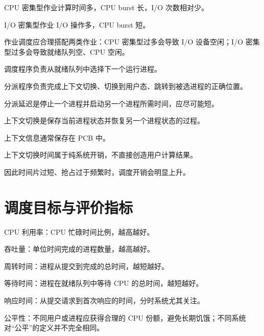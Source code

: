 \begin{points}
  \item CPU 密集型作业计算时间多，CPU burst 长，I/O 次数相对少。
  \item I/O 密集型作业 I/O 操作多，CPU burst 短。
  \item 作业调度应合理搭配两类作业：CPU 密集型过多会导致 I/O 设备空闲；I/O 密集型过多会导致就绪队列空、CPU 空闲。
\end{points}


\begin{points}
  \item 调度程序负责从就绪队列中选择下一个运行进程。
  \item 分派程序负责完成上下文切换、切换到用户态、跳转到被选进程的正确位置。
  \item 分派延迟是停止一个进程并启动另一个进程所需时间，应尽可能短。
\end{points}


\begin{points}
  \item 上下文切换是保存当前进程状态并恢复另一个进程状态的过程。
  \item 上下文信息通常保存在 PCB 中。
  \item 上下文切换时间属于纯系统开销，不直接创造用户计算结果。
  \item 因此时间片过短、抢占过于频繁时，调度开销会明显上升。
\end{points}


\section{调度目标与评价指标}
\begin{points}
  \item CPU 利用率：CPU 忙碌时间比例，越高越好。
  \item 吞吐量：单位时间完成的进程数量，越高越好。
  \item 周转时间：进程从提交到完成的总时间，越短越好。
  \item 等待时间：进程在就绪队列中等待 CPU 的总时间，越短越好。
  \item 响应时间：从提交请求到首次响应的时间，分时系统尤其关注。
  \item 公平性：不同用户或进程应获得合理的 CPU 份额，避免长期饥饿；不同系统对“公平”的定义并不完全相同。
\end{points}


